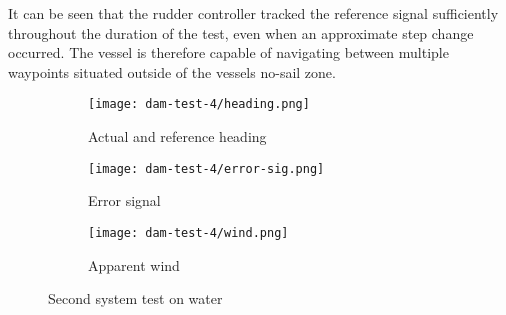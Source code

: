 It can be seen that the rudder controller tracked the reference signal sufficiently throughout the duration of the test, even when an approximate step change 
occurred. The vessel is therefore capable of navigating between multiple waypoints situated outside of the vessels no-sail zone.

\begin{figure}[h!]
    \centering
    \begin{subfigure}{=0.75\linewidth}
        \centering
        \texttt{[image: dam-test-4/heading.png]}
        \caption{Actual and reference heading}
        \label{subfig:system-2-heading}
    \end{subfigure}

    \begin{subfigure}{=0.75\linewidth}
        \centering
        \texttt{[image: dam-test-4/error-sig.png]}
        \caption{Error signal}
        \label{subfig:system-2-error}
    \end{subfigure}

    \begin{subfigure}{=0.75\linewidth}
        \centering
        \texttt{[image: dam-test-4/wind.png]}
        \caption{Apparent wind}
        \label{subfig:system-2-wind}
    \end{subfigure}

    \caption[Second system test on water]{Second system test on water}
    \label{fig:system-2-water}
\end{figure}

